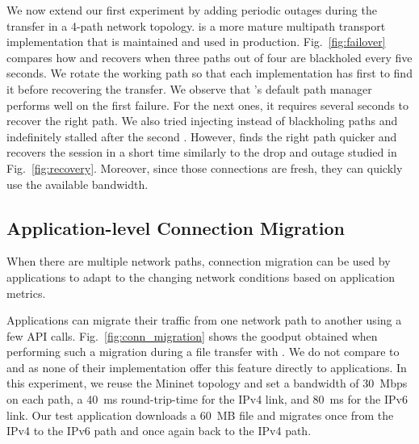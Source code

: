 We now extend our first experiment by adding periodic outages during the
transfer in a 4-path network topology.
\mptcp is a more mature multipath transport implementation that is maintained
and used in production. Fig.~\ref{fig:failover} compares how \mptcp and \tcpls recovers when three paths out of four are blackholed every five seconds. We rotate the working path so that each implementation has first to find it before recovering the transfer. We observe that \mptcp's default path manager performs well on the first failure. For the next ones, it requires several seconds to recover the right path.
We also tried injecting \tcp \rst instead of blackholing paths and \mptcp
indefinitely stalled after the second \rst. However, \tcpls finds the right path quicker and recovers the session in a short time similarly to the drop and \rst outage studied in Fig.~\ref{fig:recovery}. Moreover, since those connections are fresh, they can quickly use the available bandwidth.

\subsection{Application-level Connection Migration}
\label{sec:app-migration}

When there are multiple network paths, connection migration can be used by
applications to adapt to the changing network conditions based on application
metrics.

Applications can migrate their traffic from one network path to another using a few \tcpls API calls. Fig.~\ref{fig:conn_migration} shows the goodput obtained when performing such a migration during a file transfer with \tcpls. We do not compare \tcpls to \mptcp and \quic as none of their implementation offer this feature directly to applications. %
In this experiment, we reuse the Mininet topology %
and set a bandwidth of 30~Mbps on each path, a 40~ms round-trip-time for the IPv4 link, and 80~ms for the IPv6 link. Our test application downloads a 60~MB file and migrates once from the IPv4 to the IPv6 path and once again back to the IPv4 path.


